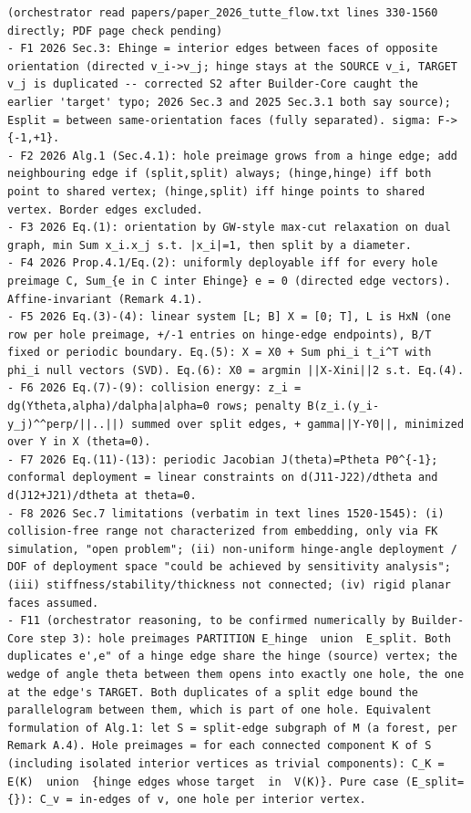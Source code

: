 \documentclass[10pt,a4paper]{article}
\begin{document}
\begin{lstlisting}
(orchestrator read papers/paper_2026_tutte_flow.txt lines 330-1560 directly; PDF page check pending)
- F1 2026 Sec.3: Ehinge = interior edges between faces of opposite orientation (directed v_i->v_j; hinge stays at the SOURCE v_i, TARGET v_j is duplicated -- corrected S2 after Builder-Core caught the earlier 'target' typo; 2026 Sec.3 and 2025 Sec.3.1 both say source); Esplit = between same-orientation faces (fully separated). sigma: F->{-1,+1}.
- F2 2026 Alg.1 (Sec.4.1): hole preimage grows from a hinge edge; add neighbouring edge if (split,split) always; (hinge,hinge) iff both point to shared vertex; (hinge,split) iff hinge points to shared vertex. Border edges excluded.
- F3 2026 Eq.(1): orientation by GW-style max-cut relaxation on dual graph, min Sum x_i.x_j s.t. |x_i|=1, then split by a diameter.
- F4 2026 Prop.4.1/Eq.(2): uniformly deployable iff for every hole preimage C, Sum_{e in C inter Ehinge} e = 0 (directed edge vectors). Affine-invariant (Remark 4.1).
- F5 2026 Eq.(3)-(4): linear system [L; B] X = [0; T], L is HxN (one row per hole preimage, +/-1 entries on hinge-edge endpoints), B/T fixed or periodic boundary. Eq.(5): X = X0 + Sum phi_i t_i^T with phi_i null vectors (SVD). Eq.(6): X0 = argmin ||X-Xini||2 s.t. Eq.(4).
- F6 2026 Eq.(7)-(9): collision energy: z_i = dg(Ytheta,alpha)/dalpha|alpha=0 rows; penalty B(z_i.(y_i-y_j)^^perp/||..||) summed over split edges, + gamma||Y-Y0||, minimized over Y in X (theta=0).
- F7 2026 Eq.(11)-(13): periodic Jacobian J(theta)=Ptheta P0^{-1}; conformal deployment = linear constraints on d(J11-J22)/dtheta and d(J12+J21)/dtheta at theta=0.
- F8 2026 Sec.7 limitations (verbatim in text lines 1520-1545): (i) collision-free range not characterized from embedding, only via FK simulation, "open problem"; (ii) non-uniform hinge-angle deployment / DOF of deployment space "could be achieved by sensitivity analysis"; (iii) stiffness/stability/thickness not connected; (iv) rigid planar faces assumed.
- F11 (orchestrator reasoning, to be confirmed numerically by Builder-Core step 3): hole preimages PARTITION E_hinge  union  E_split. Both duplicates e',e" of a hinge edge share the hinge (source) vertex; the wedge of angle theta between them opens into exactly one hole, the one at the edge's TARGET. Both duplicates of a split edge bound the parallelogram between them, which is part of one hole. Equivalent formulation of Alg.1: let S = split-edge subgraph of M (a forest, per Remark A.4). Hole preimages = for each connected component K of S (including isolated interior vertices as trivial components): C_K = E(K)  union  {hinge edges whose target  in  V(K)}. Pure case (E_split={}): C_v = in-edges of v, one hole per interior vertex.

\end{lstlisting}
\end{document}
